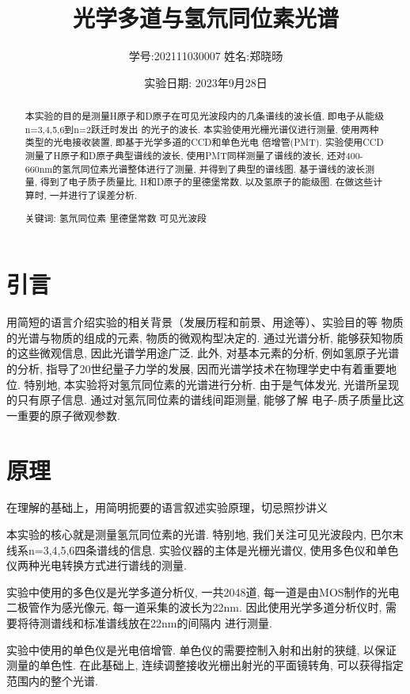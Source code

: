 \documentclass[12pt,a4paper]{article}
\title{\vspace{-4cm}\Large 光学多道与氢氘同位素光谱}  %
\author{\kaishu 学号:202111030007 \hspace{2cm} 姓名:郑晓旸}   %
\date{\kaishu  实验日期: 2023年9月28日}
\begin{document}
\maketitle

\begin{abstract}
    本实验的目的是测量H原子和D原子在可见光波段内的几条谱线的波长值, 即电子从能级n=3,4,5,6到n=2跃迁时发出
    的光子的波长. 本实验使用光栅光谱仪进行测量, 使用两种类型的光电接收装置, 即基于光学多道的CCD和单色光电
    倍增管(PMT). 实验使用CCD测量了H原子和D原子典型谱线的波长, 使用PMT同样测量了谱线的波长, 
    还对400-660nm的氢氘同位素光谱整体进行了测量, 并得到了典型的谱线图. 基于谱线的波长测量, 得到了电子质子质量比, H和D原子的里德堡常数, 以及氢原子的能级图. 
    在做这些计算时, 一并进行了误差分析. 

    关键词: 氢氘同位素 里德堡常数 可见光波段
\end{abstract}

\section{引言}

用简短的语言介绍实验的相关背景（发展历程和前景、用途等）、实验目的等
物质的光谱与物质的组成的元素, 物质的微观构型决定的. 通过光谱分析, 能够获知物质的这些微观信息, 因此光谱学用途广泛. 
此外, 对基本元素的分析, 例如氢原子光谱的分析, 指导了20世纪量子力学的发展, 因而光谱学技术在物理学史中有着重要地位. 
特别地, 本实验将对氢氘同位素的光谱进行分析. 由于是气体发光, 光谱所呈现的只有原子信息. 通过对氢氘同位素的谱线间距测量, 能够了解
电子-质子质量比这一重要的原子微观参数. 


\section{原理}
在理解的基础上，用简明扼要的语言叙述实验原理，切忌照抄讲义

本实验的核心就是测量氢氘同位素的光谱. 特别地, 我们关注可见光波段内, 巴尔末线系n=3,4,5,6四条谱线的信息. 
实验仪器的主体是光栅光谱仪, 使用多色仪和单色仪两种光电转换方式进行谱线的测量. 

实验中使用的多色仪是光学多道分析仪, 一共2048道, 
每一道是由MOS制作的光电二极管作为感光像元, 每一道采集的波长为22nm. 因此使用光学多道分析仪时, 需要将待测谱线和标准谱线放在22nm的间隔内
进行测量. 

实验中使用的单色仪是光电倍增管. 单色仪的需要控制入射和出射的狭缝, 以保证测量的单色性. 在此基础上, 连续调整接收光栅出射光的平面镜转角, 
可以获得指定范围内的整个光谱. 
\end{document}
